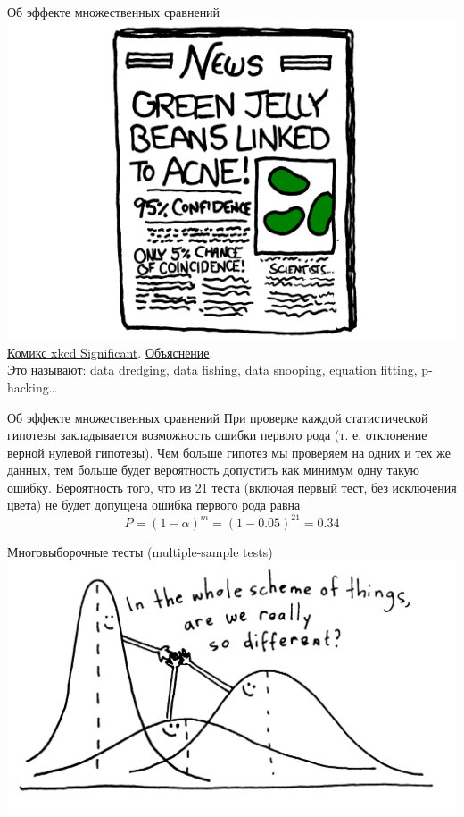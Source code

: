 \begin{frame}{Об эффекте множественных сравнений}
\vfill
\includegraphics[width=0.8\linewidth]{jellybeanexample3.png}\\
\href{https://xkcd.com/882/}{\alert{Комикс xkcd Significant}}. \href{http://www.explainxkcd.com/wiki/index.php/882}{\alert{Объяснение}}.\\
Это называют: data dredging, data fishing, data snooping, equation fitting, p-hacking\dots
\end{frame}
\begin{frame}{Об эффекте множественных сравнений}
При проверке каждой статистической гипотезы закладывается возможность ошибки первого рода (т. е. отклонение верной нулевой гипотезы). Чем больше гипотез мы проверяем на одних и тех же данных, тем больше будет вероятность допустить как минимум одну такую ошибку.  Вероятность того, что из 21 теста (включая первый тест, без исключения цвета) не будет допущена ошибка первого рода равна 
$$P = (1-\alpha)^m = (1 - 0.05)^{21} = 0.34$$
\end{frame}
\begin{frame}{Многовыборочные тесты (multiple-sample tests)}
\vfill
\includegraphics[width=\linewidth]{anova.jpg}
\end{frame}
